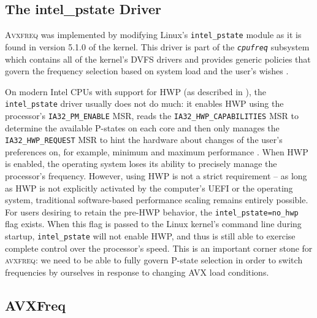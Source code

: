 \subsection{The intel\_pstate Driver}
\label{sec:design:reimplementation:intel_pstate}

\textsc{Avxfreq} was implemented by modifying \gls{Linux}'s \texttt{intel\_pstate} module as it is found in version 5.1.0 of the kernel. This driver is part of the \textit{\texttt{cpufreq}} subsystem which contains all of the kernel's \gls{DVFS} drivers and provides generic policies that govern the frequency selection based on system load and the user's wishes \cite{cpufreq}. %

On modern Intel \glspl{CPU} with support for \gls{HWP} (as described in ), the \texttt{intel\_pstate} driver usually does not do much: it enables \gls{HWP} using the processor's \texttt{IA32\_PM\_ENABLE} \gls{MSR}, reads the \texttt{IA32\_HWP\_CAPABILITIES} \gls{MSR} to determine the available \glspl{P-state} on each core and then only manages the \texttt{IA32\_HWP\_REQUEST} \gls{MSR} to hint the hardware about changes of the user's preferences on, for example, minimum and maximum performance \cite{intelsdmsysprogguide} \cite{intelpstate}. When \gls{HWP} is enabled, the operating system loses its ability to precisely manage the processor's frequency. However, using \gls{HWP} is not a strict requirement -- as long as \gls{HWP} is not explicitly activated by the computer's \gls{UEFI} or the operating system, traditional software-based performance scaling remains entirely possible. For users desiring to retain the pre-\gls{HWP} behavior, the \texttt{intel\_pstate=no\_hwp} flag exists. When this flag is passed to the \gls{Linux} kernel's command line during startup, \texttt{intel\_pstate} will not enable \gls{HWP}, and thus is still able to exercise complete control over the processor's speed. This is an important corner stone for \textsc{avxfreq}: we need to be able to fully govern \gls{P-state} selection in order to switch frequencies by ourselves in response to changing \gls{AVX} load conditions.

\subsection{AVXFreq}
\label{sec:design:reimplementation:avxfreq}

